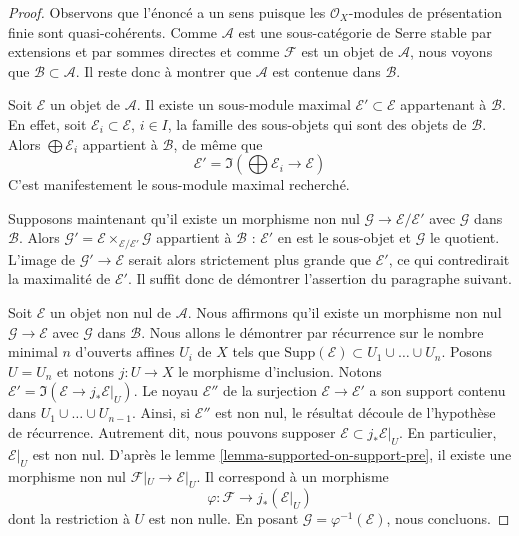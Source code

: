 \begin{proof}
Observons que l'énoncé a un sens puisque les $\mathcal{O}_X$-modules de
présentation finie sont quasi-cohérents.
Comme $\mathcal{A}$ est une sous-catégorie de Serre stable par extensions et
par sommes directes et comme $\mathcal{F}$ est un objet de $\mathcal{A}$,
nous voyons que $\mathcal{B} \subset \mathcal{A}$. Il reste donc à montrer
que $\mathcal{A}$ est contenue dans $\mathcal{B}$.

\medskip\noindent
Soit $\mathcal{E}$ un objet de $\mathcal{A}$. Il existe un sous-module
maximal $\mathcal{E}' \subset \mathcal{E}$ appartenant à $\mathcal{B}$.
En effet, soit $\mathcal{E}_i \subset \mathcal{E}$, $i \in I$, la famille
des sous-objets qui sont des objets de $\mathcal{B}$. Alors
$\bigoplus \mathcal{E}_i$ appartient à $\mathcal{B}$, de même que
$$
\mathcal{E}' = \Im(\bigoplus \mathcal{E}_i \longrightarrow \mathcal{E})
$$
C'est manifestement le sous-module maximal recherché.

\medskip\noindent
Supposons maintenant qu'il existe un morphisme non nul
$\mathcal{G} \to \mathcal{E}/\mathcal{E}'$
avec $\mathcal{G}$ dans $\mathcal{B}$. Alors
$\mathcal{G}' = \mathcal{E} \times_{\mathcal{E}/\mathcal{E}'} \mathcal{G}$
appartient à $\mathcal{B}$ : $\mathcal{E}'$ en est le sous-objet et
$\mathcal{G}$ le quotient. L'image de $\mathcal{G}' \to \mathcal{E}$ serait alors
strictement plus grande que $\mathcal{E}'$, ce qui contredirait la maximalité
de $\mathcal{E}'$. Il suffit donc de démontrer l'assertion du paragraphe
suivant.

\medskip\noindent
Soit $\mathcal{E}$ un objet non nul de $\mathcal{A}$. Nous affirmons qu'il
existe un morphisme non nul $\mathcal{G} \to \mathcal{E}$ avec
$\mathcal{G}$ dans $\mathcal{B}$. Nous allons le démontrer par récurrence sur
le nombre minimal $n$ d'ouverts affines $U_i$ de $X$ tels que
$\text{Supp}(\mathcal{E}) \subset U_1 \cup \ldots \cup U_n$.
Posons $U = U_n$ et notons $j : U \to X$ le morphisme d'inclusion.
Notons $\mathcal{E}' = \Im(\mathcal{E} \to j_*\mathcal{E}|_U)$.
Le noyau $\mathcal{E}''$ de la surjection
$\mathcal{E} \to \mathcal{E}'$ a son support contenu dans
$U_1 \cup \ldots \cup U_{n - 1}$. Ainsi, si $\mathcal{E}''$ est non nul,
le résultat découle de l'hypothèse de récurrence. Autrement dit, nous pouvons
supposer $\mathcal{E} \subset j_*\mathcal{E}|_U$.
En particulier, $\mathcal{E}|_U$ est non nul.
D'après le lemme \ref{lemma-supported-on-support-pre}, il existe une
morphisme non nul $\mathcal{F}|_U \to \mathcal{E}|_U$.
Il correspond à un morphisme
$$
\varphi : \mathcal{F} \longrightarrow j_*(\mathcal{E}|_U)
$$
dont la restriction à $U$ est non nulle.
En posant $\mathcal{G} = \varphi^{-1}(\mathcal{E})$, nous concluons.
\end{proof}

